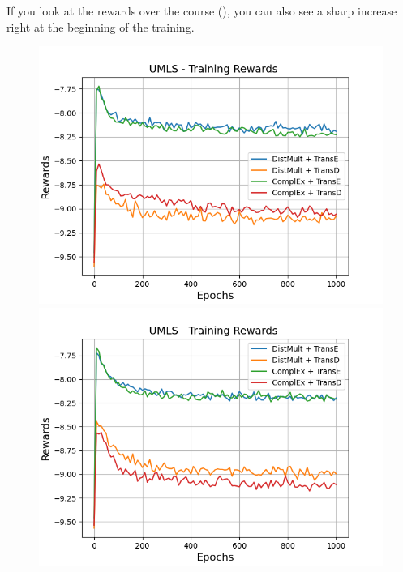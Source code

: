 If you look at the rewards over the course (), you can also see a sharp increase right at the beginning of the training.
\begin{figure}[H]
    \centering
    \begin{minipage}{.5\textwidth}
      \centering
      \includegraphics[width=0.9\linewidth]{figures/results/gan_train/not_pretrained/uncertainty/max_distribution/entropy/umls/1k_epochs/uncertainty_umls_rew.png}
    \end{minipage}%
    \begin{minipage}{.5\textwidth}
      \centering
      \includegraphics[width=0.9\linewidth]{figures/results/gan_train/not_pretrained/uncertainty/max_distribution/least_confidence/umls/uncertainty_umls_rew.png}
    \end{minipage}
    \begin{minipage}{.5\textwidth}

\end{minipage}
\end{figure}
